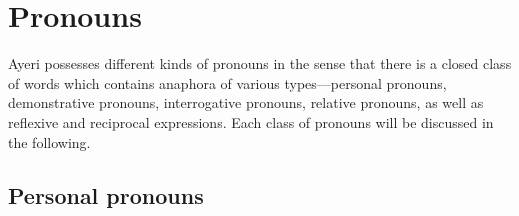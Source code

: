 

\section{Pronouns}

Ayeri possesses different kinds of pronouns in the sense that there is a closed
class of words which contains anaphora of various types---personal pronouns,
demonstrative pronouns, interrogative pronouns, relative pronouns, as well as
reflexive and reciprocal expressions. Each class of pronouns will be discussed
in the following.

\subsection{Personal pronouns}
\label{subsec:perspro}

